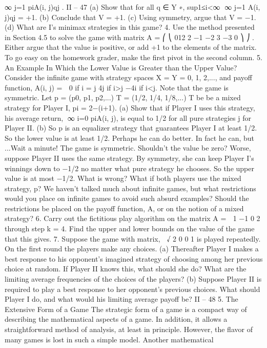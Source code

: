 ∞
j=1
piA(i, j)qj .
II – 47
(a) Show that for all q ∈ Y ∗, sup1≤i<∞
∞
j=1 A(i, j)qj = +1.
(b) Conclude that V = +1.
(c) Using symmetry, argue that V = −1.
(d) What are I’s minimax strategies in this game?
4. Use the method presented in Section 4.5 to solve the game with matrix
A =
⎛
⎝
012
2 −1 −2
3 −3 0
⎞
⎠ .
Either argue that the value is positive, or add +1 to the elements of the matrix. To go
easy on the homework grader, make the first pivot in the second column.
5. An Example In Which the Lower Value is Greater than the Upper
Value? Consider the infinite game with strategy spaces X = Y = {0, 1, 2,...}, and payoff
function,
A(i, j) =  0 if i = j
4j if i>j
−4i if i<j.
Note that the game is symmetric. Let p = (p0, p1, p2,...)
T = (1/2, 1/4, 1/8,...)
T be be a
mixed strategy for Player I, pi = 2−(i+1).
(a) Show that if Player I uses this strategy, his average return, ∞
i=0 piA(i, j), is equal
to 1/2 for all pure strategies j for Player II.
(b) So p is an equalizer strategy that guarantees Player I at least 1/2. So the lower
value is at least 1/2. Perhaps he can do better. In fact he can, but ...Wait a minute! The
game is symmetric. Shouldn’t the value be zero? Worse, suppose Player II uses the same
strategy. By symmetry, she can keep Player I’s winnings down to −1/2 no matter what
pure strategy he chooses. So the upper value is at most −1/2. What is wrong? What
if both players use the mixed strategy, p? We haven’t talked much about infinite games,
but what restrictions would you place on infinite games to avoid such absurd examples?
Should the restrictions be placed on the payoff function, A, or on the notion of a mixed
strategy?
6. Carry out the fictitious play algorithm on the matrix A =
 1 −1
0 2
through step
k = 4. Find the upper and lower bounds on the value of the game that this gives.
7. Suppose the game with matrix,  √
2 0
0 1
is played repeatedly. On the first round
the players make any choices.
(a) Thereafter Player I makes a best response to his opponent’s imagined strategy of
choosing among her previous choice at random. If Player II knows this, what should she
do? What are the limiting average frequencies of the choices of the players?
(b) Suppose Player II is required to play a best response to her opponent’s previous
choices. What should Player I do, and what would his limiting average payoff be?
II – 48
5. The Extensive Form of a Game
The strategic form of a game is a compact way of describing the mathematical aspects
of a game. In addition, it allows a straightforward method of analysis, at least in principle.
However, the flavor of many games is lost in such a simple model. Another mathematical
